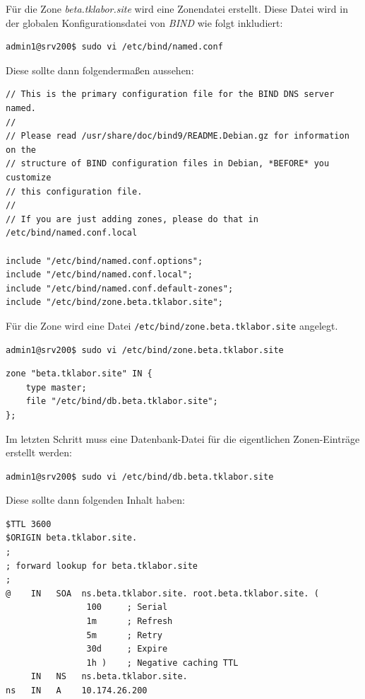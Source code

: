 Für die Zone \textit{beta.tklabor.site} wird eine Zonendatei erstellt. Diese
Datei wird in der globalen Konfigurationsdatei von \textit{BIND} wie folgt
inkludiert:

\begin{lstlisting}
admin1@srv200$ sudo vi /etc/bind/named.conf
\end{lstlisting}

Diese sollte dann folgendermaßen aussehen:

\begin{scriptsize}
\begin{lstlisting}
// This is the primary configuration file for the BIND DNS server named.
//
// Please read /usr/share/doc/bind9/README.Debian.gz for information on the 
// structure of BIND configuration files in Debian, *BEFORE* you customize 
// this configuration file.
//
// If you are just adding zones, please do that in /etc/bind/named.conf.local

include "/etc/bind/named.conf.options";
include "/etc/bind/named.conf.local";
include "/etc/bind/named.conf.default-zones";
include "/etc/bind/zone.beta.tklabor.site";
\end{lstlisting}
\end{scriptsize}

Für die Zone wird eine Datei \texttt{/etc/bind/zone.beta.tklabor.site}
angelegt.

\begin{lstlisting}
admin1@srv200$ sudo vi /etc/bind/zone.beta.tklabor.site
\end{lstlisting}

\begin{scriptsize}
\begin{lstlisting}
zone "beta.tklabor.site" IN {
	type master;
	file "/etc/bind/db.beta.tklabor.site";
};
\end{lstlisting}
\end{scriptsize}

Im letzten Schritt muss eine Datenbank-Datei für die eigentlichen
Zonen-Einträge erstellt werden:

\begin{lstlisting}
admin1@srv200$ sudo vi /etc/bind/db.beta.tklabor.site
\end{lstlisting}

Diese sollte dann folgenden Inhalt haben:

\begin{scriptsize}
\begin{lstlisting}
$TTL 3600
$ORIGIN beta.tklabor.site.
;
; forward lookup for beta.tklabor.site
;
@    IN   SOA  ns.beta.tklabor.site. root.beta.tklabor.site. ( 
				100		; Serial
				1m		; Refresh
				5m		; Retry
				30d		; Expire
				1h )	; Negative caching TTL
     IN   NS   ns.beta.tklabor.site.
ns   IN   A    10.174.26.200
\end{lstlisting}
\end{scriptsize}

